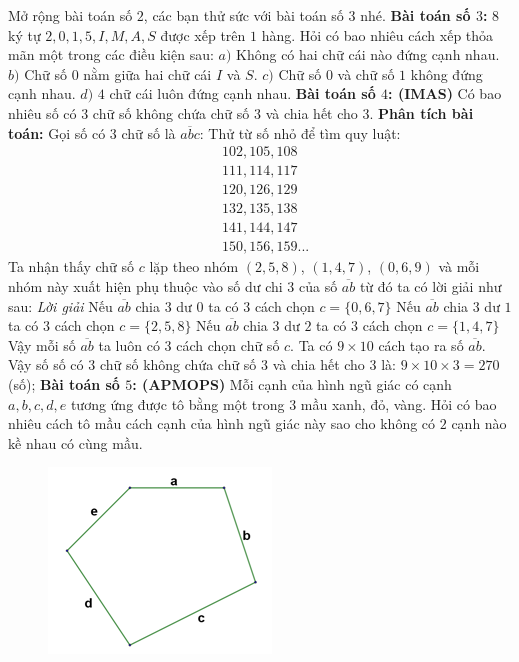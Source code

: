 \begin{multicols}{2}
	\vskip 0.1cm
	Mở rộng bài toán số $2$, các bạn thử sức với bài toán số $3$ nhé.
	\vskip 0.1cm
	\textbf{\color{toancuabi}Bài toán số $3$:}
	\vskip 0.1cm
	$8$ ký tự $2,0,1,5,I,M,A,S$ được xếp trên $1$ hàng. Hỏi có bao nhiêu cách xếp thỏa mãn một trong các điều kiện sau:
	\vskip 0.1cm
	$a)$ Không có hai chữ cái nào đứng cạnh nhau.
	\vskip 0.1cm
	$b)$ Chữ số $0$ nằm giữa hai chữ cái $I$ và $S$.
	\vskip 0.1cm
	$c)$ Chữ số $0$ và chữ số $1$ không đứng cạnh nhau.
	\vskip 0.1cm
	$d)$ $4$ chữ cái luôn đứng cạnh nhau.
	\vskip 0.1cm
	\textbf{\color{toancuabi}Bài toán số $4$: (IMAS)}
	\vskip 0.1cm
	Có bao nhiêu số có $3$ chữ số không chứa chữ số $3$ và chia hết cho $3$.
	\vskip 0.1cm
	\textbf{\color{toancuabi}Phân tích bài toán:}
	\vskip 0.1cm
	Gọi số có $3$ chữ số là $\overline{abc}$:
	\vskip 0.1cm
		Thử từ số nhỏ để tìm quy luật:
		\begin{align*}
			&102, 105, 108\\
			&111, 114, 117\\
			&120, 126, 129\\
			&132, 135, 138\\
			&141, 144, 147\\
			&150, 156, 159...
		\end{align*}
		Ta nhận thấy chữ số $c$ lặp theo nhóm $(2,5,8)$, $(1,4,7)$, $(0,6,9)$ và mỗi nhóm này xuất hiện phụ thuộc vào số dư chi $3$ của số $\overline{ab}$ từ đó ta có lời giải như sau:
		\vskip 0.1cm
		\textit{Lời giải}
		\vskip 0.1cm
		Nếu $\overline{ab}$ chia $3$ dư $0$ ta có $3$ cách chọn $c=\{0,6,7\}$
		\vskip 0.1cm
		Nếu $\overline{ab}$ chia $3$ dư $1$ ta có $3$ cách chọn $c=\{2,5,8\}$
		\vskip 0.1cm
		Nếu $\overline{ab}$ chia $3$ dư $2$ ta có $3$ cách chọn $c=\{1,4,7\}$
		\vskip 0.1cm
		Vậy mỗi số $\overline{ab}$ ta luôn có $3$ cách chọn chữ số $c$.
		\vskip 0.1cm
		Ta có $9\times 10$ cách tạo ra số $\overline{ab}$.
		\vskip 0.1cm
		Vậy số số có $3$ chữ số không chứa chữ số $3$ và chia hết cho $3$ là: $9\times10\times3=270$ (số);
	\vskip 0.1cm
	\textbf{\color{toancuabi}Bài toán số $5$: (APMOPS)}
	\vskip 0.1cm
	Mỗi cạnh của hình ngũ giác có cạnh $a,b,c,d,e$ tương ứng được tô bằng một trong $3$ mầu xanh, đỏ, vàng. Hỏi có bao nhiêu cách tô mầu cách cạnh của hình ngũ giác này sao cho không có $2$ cạnh nào kề nhau có cùng mầu.
		\begin{figure}[H]
			\centering
			\vspace*{-10pt}
			\captionsetup{labelformat=empty, justification=centering}
			\includegraphics[width=0.75\linewidth]{_8}

\end{figure}
\end{multicols}
